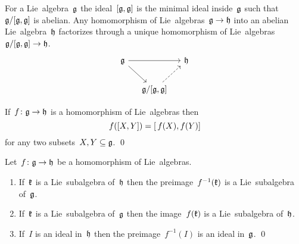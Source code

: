 \begin{remark}
  For a Lie~algebra~$\mathfrak{g}$ the ideal~$[\mathfrak{g},\mathfrak{g}]$ is the minimal ideal inside~$\mathfrak{g}$ such that~$\mathfrak{g}/[\mathfrak{g},\mathfrak{g}]$ is abelian.
  Any homomorphism of Lie~algebras~$\mathfrak{g} \to \mathfrak{h}$ into an abelian Lie~algebra~$\mathfrak{h}$ factorizes through a unique homomorphism of Lie~algebras~$\mathfrak{g}/[\mathfrak{g}, \mathfrak{g}] \to \mathfrak{h}$.
  \[
    \begin{tikzcd}[column sep = small]
      \glie
      \arrow{rr}
      \arrow{dr}
      &
      {}
      &
      \hlie
      \\
      {}
      &
      \glie/[\glie,\glie]
      \arrow[dashed]{ur}
      &
      {}
    \end{tikzcd}
  \]
\end{remark}


\begin{lemma}
  \label{homomorphisms respect commutators of sets}
  If~$f \colon \mathfrak{g} \to \mathfrak{h}$ is a homomorphism of Lie~algebras then
  \[
    f([X,Y])
    =
    [\, f(X), f(Y)]
  \]
  for any two subsets~$X, Y \subseteq \mathfrak{g}$.
  \qed
\end{lemma}


\begin{lemma}
  Let~$f \colon \mathfrak{g} \to \mathfrak{h}$ be a homomorphism of Lie~algebras.
  \begin{enumerate}
    \item
      If~$\mathfrak{k}$ is a Lie~subalgebra of~$\mathfrak{h}$ then the preimage~$f^{-1}(\mathfrak{k})$ is a Lie~subalgebra of~$\mathfrak{g}$.
    \item
      If~$\mathfrak{k}$ is a Lie~subalgebra of~$\mathfrak{g}$ then the image~$f(\mathfrak{k})$ is a Lie~subalgebra of~$\mathfrak{h}$.
    \item
      If~$I$ is an ideal in~$\mathfrak{h}$ then the preimage~$f^{-1}(I)$ is an ideal in~$\mathfrak{g}$.
    \qed
  \end{enumerate}
\end{lemma}


